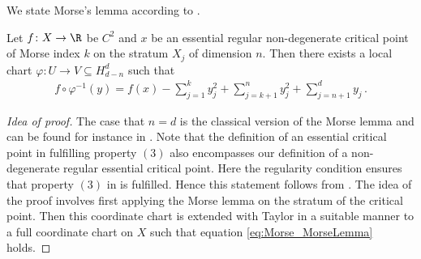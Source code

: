 We state Morse's lemma according to \cite[Lemma 5]{Handron2002}.
\begin{proposition}
  Let $f\colon X\to\R$ be $C^{2}$ and $x$ be an essential regular non-degenerate
  critical point of Morse index $k$ on the stratum $X_j$ of dimension $n$. Then there exists a
  local chart $\varphi\colon U\to V\subseteq H_{d-n}^d$ such that
  \begin{align}
    f\circ\varphi^{-1}(y)=f(x)-\sum_{j=1}^ky_j^2+\sum_{j=k+1}^ny_j^2+\sum_{j=n+1}^dy_j\,.
    \label{eq:Morse_MorseLemma}
  \end{align}
\end{proposition}
\begin{proof}[Idea of proof]
  The case that $n=d$ is the classical version of the Morse lemma and can be found for instance
  in \cite[§6, Lemma 1.1]{Hirsch1994}.
  Note that the definition of an essential critical point in \cite{Handron2002} 
  fulfilling property $(3)$ also encompasses our definition of a non-degenerate regular
  essential critical point. Here the regularity condition ensures that property $(3)$ in \cite{Handron2002}
  is fulfilled. Hence this statement follows from \cite[Lemma 5]{Handron2002}.
  The idea of the proof involves first applying the Morse lemma on the stratum of the critical point.
  Then this coordinate chart is extended with Taylor in a suitable manner to a
  full coordinate chart on $X$ such that equation \eqref{eq:Morse_MorseLemma} holds.
\end{proof}

